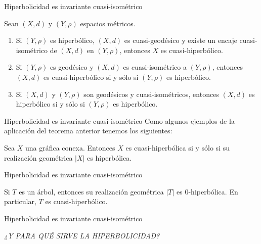 \documentclass[xcolor=dvipsnames]{beamer}
\theoremstyle{largebreak}
\newcommand\abs[1]{\ensuremath{\left|#1\right|}}
\begin{document}
\begin{frame}{Hiperbolicidad es invariante cuasi-isométrico}
    \begin{cor}
        Sean $(X,d)$ y $(Y,\rho)$ espacios métricos.
        \begin{enumerate}[label = \textit{(\arabic*)}]
            \item Si $(Y,\rho)$ es hiperbólico, $(X,d)$ es cuasi-geodésico y existe un encaje cuasi-isométrico de $(X,d)$ en $(Y,\rho)$, entonces $X$ es cuasi-hiperbólico.
            \item Si $(Y,\rho)$ es geodésico y $(X,d)$ es cuasi-isométrico a $(Y,\rho)$, entonces $(X,d)$ es cuasi-hiperbólico si y sólo si $(Y,\rho)$ es hiperbólico.
            \item Si $(X,d)$ y $(Y,\rho)$ son geodésicos y cuasi-isométricos, entonces $(X,d)$ es hiperbólico si y sólo si $(Y,\rho)$ es hiperbólico. 
        \end{enumerate}
    \end{cor}
\end{frame}

\begin{frame}{Hiperbolicidad es invariante cuasi-isométrico}
    Como algunos ejemplos de la aplicación del teorema anterior tenemos los siguientes:

    \begin{cor}
        Sea $X$ una gráfica conexa. Entonces $X$ es cuasi-hiperbólica si y sólo si su realización geométrica $\abs{X}$ es hiperbólica.
    \end{cor}

\end{frame}

\begin{frame}{Hiperbolicidad es invariante cuasi-isométrico}
    \begin{propo}
        Si $T$ es un árbol, entonces su realización geométrica $\abs{T}$ es $0$-hiperbólica. En particular, $T$ es cuasi-hiperbólico.
    \end{propo}
\end{frame}

\begin{frame}{Hiperbolicidad es invariante cuasi-isométrico}
    \begin{center}
        \Large\textit{¿Y PARA QUÉ SIRVE LA HIPERBOLICIDAD?}
    \end{center}
\end{frame}
\end{document}
